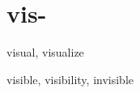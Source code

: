 \chapter{vis-}

\begin{word}{visual, visualize}
\end{word}

\begin{word}{visible, visibility, invisible}
\end{word}